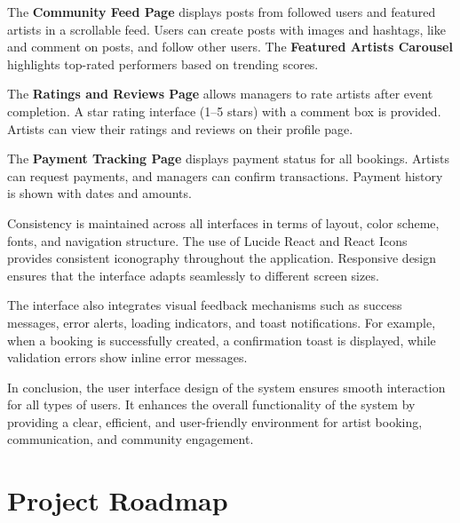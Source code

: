 \documentclass[12pt,a4paper]{report}
\begin{document}
The \textbf{Community Feed Page} displays posts from followed users and featured artists in a scrollable feed. Users can create posts with images and hashtags, like and comment on posts, and follow other users. The \textbf{Featured Artists Carousel} highlights top-rated performers based on trending scores.

The \textbf{Ratings and Reviews Page} allows managers to rate artists after event completion. A star rating interface (1--5 stars) with a comment box is provided. Artists can view their ratings and reviews on their profile page.

The \textbf{Payment Tracking Page} displays payment status for all bookings. Artists can request payments, and managers can confirm transactions. Payment history is shown with dates and amounts.

Consistency is maintained across all interfaces in terms of layout, color scheme, fonts, and navigation structure. The use of Lucide React and React Icons provides consistent iconography throughout the application. Responsive design ensures that the interface adapts seamlessly to different screen sizes.

The interface also integrates visual feedback mechanisms such as success messages, error alerts, loading indicators, and toast notifications. For example, when a booking is successfully created, a confirmation toast is displayed, while validation errors show inline error messages.

In conclusion, the user interface design of the system ensures smooth interaction for all types of users. It enhances the overall functionality of the system by providing a clear, efficient, and user-friendly environment for artist booking, communication, and community engagement.

\setcounter{chapter}{5}
\clearpage
\thispagestyle{empty}

\noindent
{}

\clearpage
{}
\setcounter{section}{0}
\section{Project Roadmap}
\end{document}
